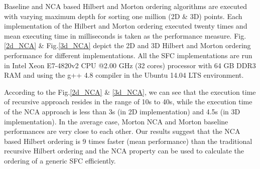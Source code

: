 \documentclass{sig-alternate}
\begin{document}
Baseline and NCA based Hilbert and Morton ordering algorithms are executed with varying maximum depth for sorting one million (2D \& 3D) points. 
Each implementation of the Hilbert and Morton ordering executed twenty times and mean executing time in milliseconds is taken as the performance measure.
Fig.\ref{2d_NCA} \& Fig.\ref{3d_NCA} depict the 2D and 3D Hilbert and Morton ordering performance for different implementations. All the SFC implementations are run in Intel Xeon E7-4820v2 CPU @2.00 GHz (32 cores) processor
with 64 GB DDR3 RAM and using the g++ 4.8 compiler in the Ubuntu 14.04 LTS environment. 

According to the Fig.\ref{2d_NCA} \& \ref{3d_NCA}, we can see that the execution time of recursive approach resides in the range of 10s to 40s, while the execution time of the NCA approach
is less than 3s (in 2D implementation) and 4.5s (in 3D implementation). 
In the average case, Morton NCA and Morton baseline performances are very close to each other. Our results suggest that the NCA based Hilbert ordering is 9 times faster (mean performance) than the traditional recursive Hilbert
ordering and the NCA property can be used to calculate the ordering of a generic SFC efficiently. 
\end{document}
